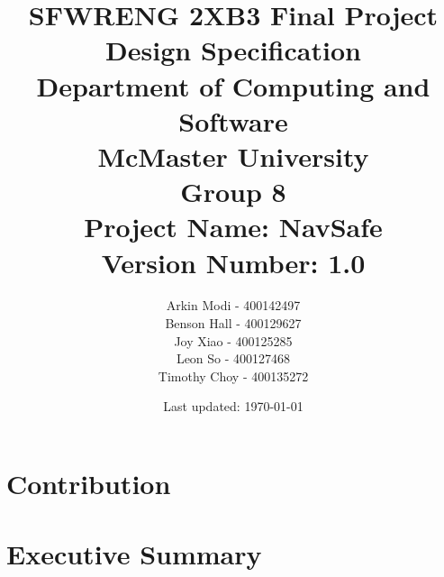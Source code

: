 \documentclass[12pt]{article}
\title{SFWRENG 2XB3 Final Project \\
        \large Design Specification\\
        \vspace{1ex}
        \large Department of Computing and Software\\
        \large McMaster University\\
        \vspace{1ex}
        \large Group 8\\
        \large Project Name: NavSafe\\
        \large Version Number: 1.0}
\author{Arkin Modi - 400142497\\
        Benson Hall - 400129627\\
        Joy Xiao - 400125285\\
        Leon So - 400127468\\
        Timothy Choy - 400135272}
\date{Last updated: \today}
\begin{document}
\maketitle
\newpage

\section{Contribution}
\section{Executive Summary}

\newpage
\tableofcontents
\newpage
\end{document}
